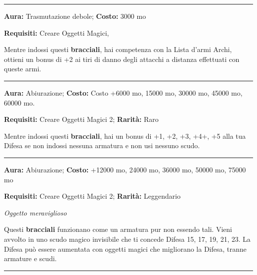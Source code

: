 \begin{multicols}{2}
\smallskip\noindent\rule{\linewidth}{2pt}  \hypertarget{Braccialidell'Arciere}{}\smallskip{}\noindent\label{Braccialidell'Arciere}

\textbf{Aura:} Trasmutazione debole; \textbf{Costo:} 3000 mo

\textbf{Requisiti:} Creare Oggetti Magici,

Mentre indossi questi \textbf{bracciali}, hai competenza con la Lista d'armi Archi, ottieni un bonus di +2 ai tiri di danno degli attacchi a distanza effettuati con queste armi.

\smallskip\noindent\rule{\linewidth}{2pt}  \hypertarget{BraccialidellaDifesa}{}\smallskip{}\noindent\label{BraccialidellaDifesa}

\textbf{Aura:} Abiurazione; \textbf{Costo:}  Costo +6000 mo, 15000 mo, 30000 mo, 45000 mo, 60000 mo.

\textbf{Requisiti:} Creare Oggetti Magici 2; \textbf{Rarità:} Raro

Mentre indossi questi \textbf{bracciali}, hai un bonus di +1, +2, +3, +4+, +5 alla tua Difesa se non indossi nessuna armatura e non usi nessuno scudo.

\smallskip\noindent\rule{\linewidth}{2pt}  \hypertarget{BraccialidellaDifesaMaggiore}{}\smallskip{}\noindent\label{BraccialidellaDifesaMaggiore}

\textbf{Aura:} Abiurazione;  \textbf{Costo:}  +12000 mo, 24000 mo, 36000 mo, 50000 mo, 75000 mo

\textbf{Requisiti:} Creare Oggetti Magici 2; \textbf{Rarità:} Leggendario

\emph{Oggetto meraviglioso}

Questi \textbf{bracciali} funzionano come un armatura pur non essendo tali. Vieni avvolto in uno scudo magico invisibile che ti concede Difesa 15, 17, 19, 21, 23. La Difesa può essere aumentata con oggetti magici che migliorano la Difesa, tranne armature e scudi.

\smallskip\noindent\rule{\linewidth}{2pt}  \hypertarget{BracieredelComandodegliElementalidelFuoco}{}\smallskip{}\noindent\label{BracieredelComandodegliElementalidelFuoco}


\end{multicols}
